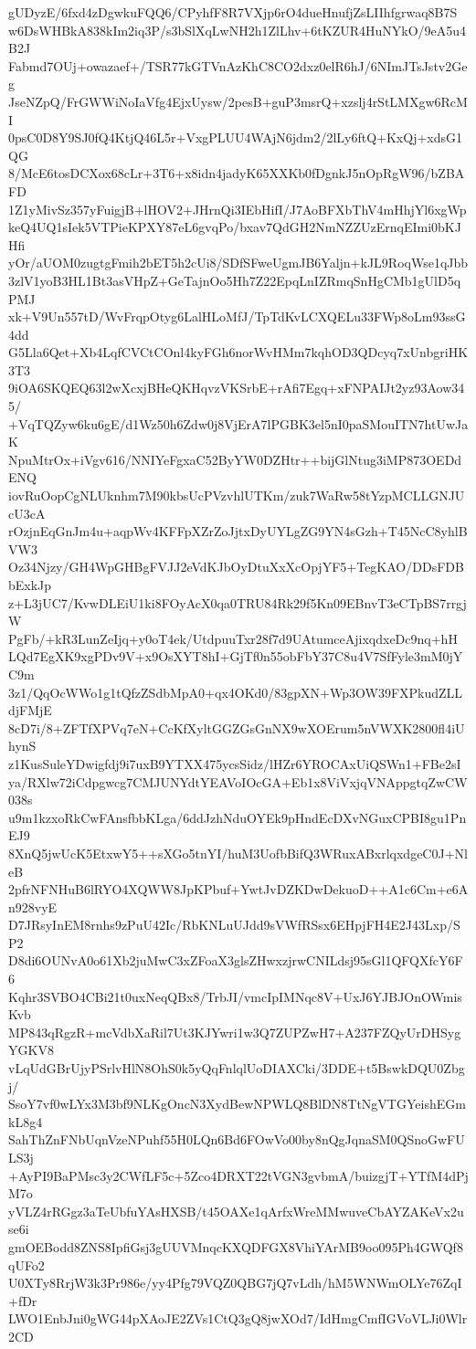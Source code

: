 gUDyzE/6fxd4zDgwkuFQQ6/CPyhfF8R7VXjp6rO4dueHnufjZsLIIhfgrwaq8B7S
w6DsWHBkA838kIm2iq3P/s3bSlXqLwNH2h1ZlLhv+6tKZUR4HuNYkO/9eA5u4B2J
Fabmd7OUj+owazaef+/TSR77kGTVnAzKhC8CO2dxz0elR6hJ/6NImJTsJstv2Geg
JseNZpQ/FrGWWiNoIaVfg4EjxUysw/2pesB+guP3msrQ+xzslj4rStLMXgw6RcMI
0psC0D8Y9SJ0fQ4KtjQ46L5r+VxgPLUU4WAjN6jdm2/2lLy6ftQ+KxQj+xdsG1QG
8/McE6tosDCXox68cLr+3T6+x8idn4jadyK65XXKb0fDgnkJ5nOpRgW96/bZBAFD
1Z1yMivSz357yFuigjB+lHOV2+JHrnQi3IEbHifI/J7AoBFXbThV4mHhjYl6xgWp
keQ4UQ1sIek5VTPieKPXY87eL6gvqPo/bxav7QdGH2NmNZZUzErnqEImi0bKJHfi
yOr/aUOM0zugtgFmih2bET5h2cUi8/SDfSFweUgmJB6Yaljn+kJL9RoqWse1qJbb
3zlV1yoB3HL1Bt3asVHpZ+GeTajnOo5Hh7Z22EpqLnIZRmqSnHgCMb1gUlD5qPMJ
xk+V9Un557tD/WvFrqpOtyg6LalHLoMfJ/TpTdKvLCXQELu33FWp8oLm93ssG4dd
G5Lla6Qet+Xb4LqfCVCtCOnl4kyFGh6norWvHMm7kqhOD3QDcyq7xUnbgriHK3T3
9iOA6SKQEQ63l2wXcxjBHeQKHqvzVKSrbE+rAfi7Egq+xFNPAIJt2yz93Aow345/
+VqTQZyw6ku6gE/d1Wz50h6Zdw0j8VjErA7lPGBK3el5nI0paSMouITN7htUwJaK
NpuMtrOx+iVgv616/NNIYeFgxaC52ByYW0DZHtr++bijGlNtug3iMP873OEDdENQ
iovRuOopCgNLUknhm7M90kbsUcPVzvhlUTKm/zuk7WaRw58tYzpMCLLGNJUcU3cA
rOzjnEqGnJm4u+aqpWv4KFFpXZrZoJjtxDyUYLgZG9YN4sGzh+T45NcC8yhlBVW3
Oz34Njzy/GH4WpGHBgFVJJ2eVdKJbOyDtuXxXcOpjYF5+TegKAO/DDsFDBbExkJp
z+L3jUC7/KvwDLEiU1ki8FOyAcX0qa0TRU84Rk29f5Kn09EBnvT3eCTpBS7rrgjW
PgFb/+kR3LunZeIjq+y0oT4ek/UtdpuuTxr28f7d9UAtumceAjixqdxeDc9nq+hH
LQd7EgXK9xgPDv9V+x9OsXYT8hI+GjTf0n55obFbY37C8u4V7SfFyle3mM0jYC9m
3z1/QqOcWWo1g1tQfzZSdbMpA0+qx4OKd0/83gpXN+Wp3OW39FXPkudZLLdjFMjE
8cD7i/8+ZFTfXPVq7eN+CcKfXyltGGZGsGnNX9wXOErum5nVWXK2800fl4iUhynS
z1KusSuleYDwigfdj9i7uxB9YTXX475ycsSidz/lHZr6YROCAxUiQSWn1+FBe2sI
ya/RXlw72iCdpgwcg7CMJUNYdtYEAVoIOcGA+Eb1x8ViVxjqVNAppgtqZwCW038s
u9m1kzxoRkCwFAnsfbbKLga/6ddJzhNduOYEk9pHndEcDXvNGuxCPBI8gu1PnEJ9
8XnQ5jwUcK5EtxwY5++sXGo5tnYI/huM3UofbBifQ3WRuxABxrlqxdgeC0J+NleB
2pfrNFNHuB6lRYO4XQWW8JpKPbuf+YwtJvDZKDwDekuoD++A1c6Cm+e6An928vyE
D7JRsyInEM8rnhs9zPuU42Ic/RbKNLuUJdd9sVWfRSsx6EHpjFH4E2J43Lxp/SP2
D8di6OUNvA0o61Xb2juMwC3xZFoaX3glsZHwxzjrwCNILdsj95sGl1QFQXfcY6F6
Kqhr3SVBO4CBi21t0uxNeqQBx8/TrbJI/vmcIpIMNqc8V+UxJ6YJBJOnOWmisKvb
MP843qRgzR+mcVdbXaRil7Ut3KJYwri1w3Q7ZUPZwH7+A237FZQyUrDHSygYGKV8
vLqUdGBrUjyPSrlvHlN8OhS0k5yQqFnlqlUoDIAXCki/3DDE+t5BswkDQU0Zbgj/
SsoY7vf0wLYx3M3bf9NLKgOncN3XydBewNPWLQ8BlDN8TtNgVTGYeishEGmkL8g4
SahThZnFNbUqnVzeNPuhf55H0LQn6Bd6FOwVo00by8nQgJqnaSM0QSnoGwFULS3j
+AyPI9BaPMsc3y2CWfLF5c+5Zco4DRXT22tVGN3gvbmA/buizgjT+YTfM4dPjM7o
yVLZ4rRGgz3aTeUbfuYAsHXSB/t45OAXe1qArfxWreMMwuveCbAYZAKeVx2use6i
gmOEBodd8ZNS8IpfiGsj3gUUVMnqcKXQDFGX8VhiYArMB9oo095Ph4GWQf8qUFo2
U0XTy8RrjW3k3Pr986e/yy4Pfg79VQZ0QBG7jQ7vLdh/hM5WNWmOLYe76ZqI+fDr
LWO1EnbJni0gWG44pXAoJE2ZVs1CtQ3gQ8jwXOd7/IdHmgCmfIGVoVLJi0Wlr2CD
